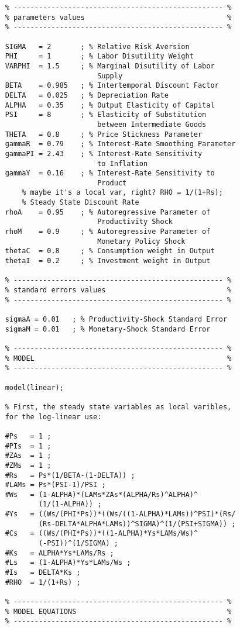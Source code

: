 \documentclass[
	12pt, 
	]{article}
\numberwithin{equation}{section}
\theoremstyle{definition}
\theoremstyle{plain}
\theoremstyle{plain}
\theoremstyle{plain}
\begin{document}
\begin{verbatim}
	% -------------------------------------------------- %
	% parameters values                                  %
	% -------------------------------------------------- % 
	
	SIGMA   = 2       ; % Relative Risk Aversion
	PHI     = 1       ; % Labor Disutility Weight
	VARPHI  = 1.5     ; % Marginal Disutility of Labor 
	                      Supply
	BETA    = 0.985   ; % Intertemporal Discount Factor
	DELTA   = 0.025   ; % Depreciation Rate
	ALPHA   = 0.35    ; % Output Elasticity of Capital
	PSI     = 8       ; % Elasticity of Substitution 
	                      between Intermediate Goods
	THETA   = 0.8     ; % Price Stickness Parameter
	gammaR  = 0.79    ; % Interest-Rate Smoothing Parameter
	gammaPI = 2.43    ; % Interest-Rate Sensitivity 
	                      to Inflation
	gammaY  = 0.16    ; % Interest-Rate Sensitivity to 
	                      Product
		% maybe it's a local var, right? RHO = 1/(1+Rs); 
		% Steady State Discount Rate
	rhoA    = 0.95    ; % Autoregressive Parameter of 
	                      Productivity Shock
	rhoM    = 0.9     ; % Autoregressive Parameter of 
	                      Monetary Policy Shock
	thetaC  = 0.8     ; % Consumption weight in Output
	thetaI  = 0.2     ; % Investment weight in Output
	
	% -------------------------------------------------- % 
	% standard errors values                             %
	% -------------------------------------------------- %
	
	sigmaA = 0.01   ; % Productivity-Shock Standard Error
	sigmaM = 0.01   ; % Monetary-Shock Standard Error
	
	% -------------------------------------------------- %
	% MODEL                                              %
	% -------------------------------------------------- %
	
	model(linear);
	
	% First, the steady state variables as local varibles, 
	for the log-linear use:
	
	#Ps   = 1 ;
	#PIs  = 1 ;
	#ZAs  = 1 ;
	#ZMs  = 1 ;
	#Rs   = Ps*(1/BETA-(1-DELTA)) ;
	#LAMs = Ps*(PSI-1)/PSI ;
	#Ws   = (1-ALPHA)*(LAMs*ZAs*(ALPHA/Rs)^ALPHA)^
	        (1/(1-ALPHA)) ;
	#Ys   = ((Ws/(PHI*Ps))*((Ws/((1-ALPHA)*LAMs))^PSI)*(Rs/
	        (Rs-DELTA*ALPHA*LAMs))^SIGMA)^(1/(PSI+SIGMA)) ;
	#Cs   = ((Ws/(PHI*Ps))*((1-ALPHA)*Ys*LAMs/Ws)^
	        (-PSI))^(1/SIGMA) ;
	#Ks   = ALPHA*Ys*LAMs/Rs ;
	#Ls   = (1-ALPHA)*Ys*LAMs/Ws ;
	#Is   = DELTA*Ks ;
	#RHO  = 1/(1+Rs) ;
	
	% -------------------------------------------------- % 
	% MODEL EQUATIONS                                    %
	% -------------------------------------------------- %
	

\end{verbatim}
\end{document}
